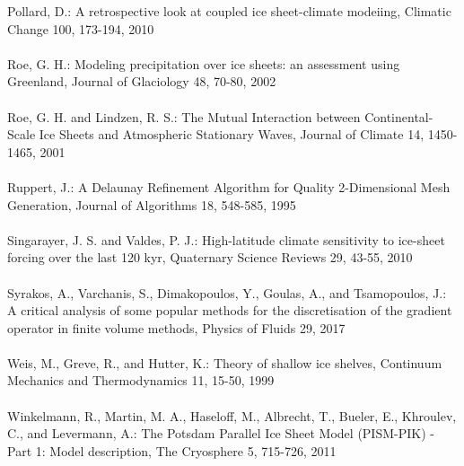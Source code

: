 \documentclass{article}
\begin{document}
Pollard, D.: A retrospective look at coupled ice sheet-climate modeiing, Climatic Change 100, 173-194, 2010\\
\\
Roe, G. H.: Modeling precipitation over ice sheets: an assessment using Greenland, Journal of Glaciology 48, 70-80, 2002\\
\\
Roe, G. H. and Lindzen, R. S.: The Mutual Interaction between Continental-Scale Ice Sheets and Atmospheric Stationary Waves, Journal of Climate 14, 1450-1465, 2001\\
\\
Ruppert, J.: A Delaunay Refinement Algorithm for Quality 2-Dimensional Mesh Generation, Journal of Algorithms 18, 548-585, 1995\\
\\
Singarayer, J. S. and Valdes, P. J.: High-latitude climate sensitivity to ice-sheet forcing over the last 120 kyr, Quaternary Science Reviews 29, 43-55, 2010\\
\\
Syrakos, A., Varchanis, S., Dimakopoulos, Y., Goulas, A., and Tsamopoulos, J.: A critical analysis of some popular methods for the discretisation of the gradient operator in finite volume methods, Physics of Fluids 29, 2017\\
\\
Weis, M., Greve, R., and Hutter, K.: Theory of shallow ice shelves, Continuum Mechanics and Thermodynamics 11, 15-50, 1999\\
\\
Winkelmann, R., Martin, M. A., Haseloff, M., Albrecht, T., Bueler, E., Khroulev, C., and Levermann, A.: The Potsdam Parallel Ice Sheet Model (PISM-PIK) - Part 1: Model description, The Cryosphere 5, 715-726, 2011\\
\\
\end{document}
